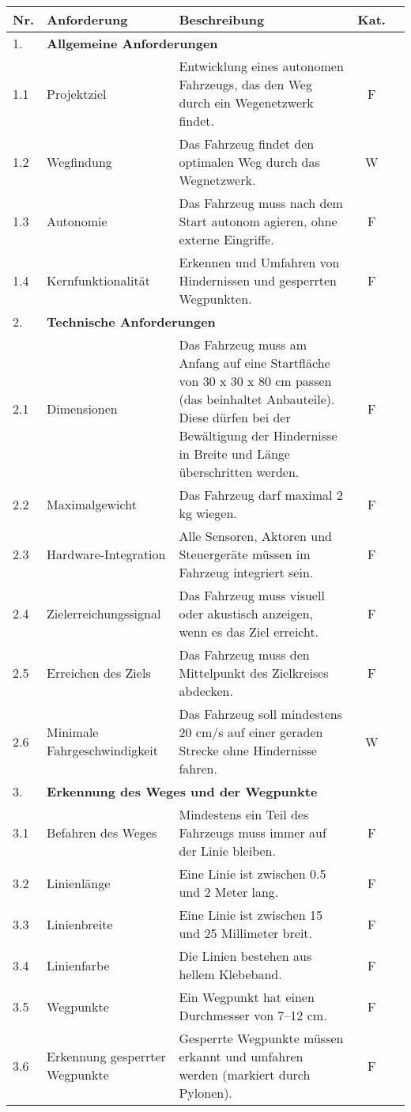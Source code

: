 \documentclass[../main.tex]{subfiles}
\begin{document}
\begin{longtable}[]{@{}lp{4.5cm}p{7.5cm}cc}
  \textbf{Nr.}
& \textbf{Anforderung}
& \textbf{Beschreibung}
& \textbf{Kat.}

\tabularnewline
\hline
\endhead
  1.  & \multicolumn{4}{l}{\textbf{Allgemeine Anforderungen}} \\ \hline
  1.1 & Projektziel & Entwicklung eines autonomen Fahrzeugs, das den Weg durch ein Wegenetzwerk findet. & F\\ \hline
  1.2 & Wegfindung & Das Fahrzeug findet den optimalen Weg durch das Wegnetzwerk. & W \\ \hline
  1.3 & Autonomie & Das Fahrzeug muss nach dem Start autonom agieren, ohne externe Eingriffe. & F  \\ \hline
  1.4 & Kernfunktionalität & Erkennen und Umfahren von Hindernissen und gesperrten Wegpunkten. & F  \\ \hline
  
  2.  & \multicolumn{4}{l}{\textbf{Technische Anforderungen}} \\ \hline
  2.1 & Dimensionen & Das Fahrzeug muss am Anfang auf eine Startfläche von 30 x 30 x 80 cm passen (das beinhaltet Anbauteile). Diese dürfen bei der Bewältigung der Hindernisse in Breite und Länge überschritten werden. & F \\ \hline
  2.2 & Maximalgewicht & Das Fahrzeug darf maximal 2 kg wiegen. & F  \\ \hline
  2.3 & Hardware-Integration & Alle Sensoren, Aktoren und Steuergeräte müssen im Fahrzeug integriert sein. & F\\ \hline
  2.4 & Zielerreichungssignal & Das Fahrzeug muss visuell oder akustisch anzeigen, wenn es das Ziel erreicht. & F \\ \hline
  2.5 & Erreichen des Ziels & Das Fahrzeug muss den Mittelpunkt des Zielkreises abdecken. & F \\ \hline
  2.6 & Minimale Fahrgeschwindigkeit & Das Fahrzeug soll mindestens 20 cm/s auf einer geraden Strecke ohne Hindernisse fahren. & W \\ \hline
 
  3.  & \multicolumn{4}{l}{\textbf{Erkennung des Weges und der Wegpunkte}} \\ \hline
  3.1 & Befahren des Weges & Mindestens ein Teil des Fahrzeugs muss immer auf der Linie bleiben. & F \\ \hline
  3.2 & Linienlänge & Eine Linie ist zwischen 0.5 und 2 Meter lang. & F \\ \hline
  3.3 & Linienbreite & Eine Linie ist zwischen 15 und 25 Millimeter breit. & F \\ \hline
  3.4 & Linienfarbe & Die Linien bestehen aus hellem Klebeband. & F \\ \hline
  3.5 & Wegpunkte & Ein Wegpunkt hat einen Durchmesser von 7–12 cm. & F \\ \hline
  3.6 & Erkennung gesperrter Wegpunkte & Gesperrte Wegpunkte müssen erkannt und umfahren werden (markiert durch Pylonen). & F \\ \hline


\end{longtable}
\end{document}
